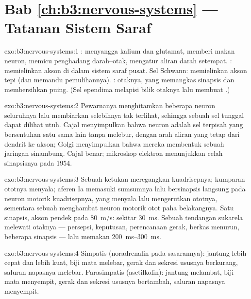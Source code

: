 \section*{Bab \ref{ch:b3:nervous-systems} --- Tatanan Sistem Saraf}

\begin{solution}{exo:b3:nervous-systems:1}
: menyangga kalium dan glutamat, memberi makan neuron, memicu
penghadang darah--otak, mengatur aliran darah setempat. :
memielinkan akson di dalam sistem saraf pusat. Sel Schwann:
memielinkan akson tepi (dan memandu pemulihannya). :
 otaknya, yang memangkas sinapsis dan membersihkan puing.
(Sel ependima melapisi bilik otaknya lalu membuat .)
\end{solution}

\begin{solution}{exo:b3:nervous-systems:2}
Pewarnanya menghitamkan beberapa neuron seluruhnya lalu membiarkan selebihnya
tak terlihat, sehingga sebuah sel tunggal dapat dilihat utuh. Cajal menyimpulkan bahwa
neuron adalah sel terpisah yang bersentuhan satu sama lain tanpa melebur, dengan
arah aliran yang tetap dari dendrit ke akson; Golgi menyimpulkan bahwa
mereka membentuk sebuah jaringan sinambung. Cajal benar; mikroskop
elektron menunjukkan celah sinapsisnya pada 1954.
\end{solution}

\begin{solution}{exo:b3:nervous-systems:3}
Sebuah ketukan meregangkan kuadrisepnya; kumparan ototnya menyala; aferen
Ia memasuki sumsumnya lalu bersinapsis langsung pada neuron motorik
kuadrisepnya, yang menyala lalu mengerutkan ototnya, sementara sebuah 
menghambat neuron motorik otot paha belakangnya. Satu sinapsis, akson pendek pada
\qty{80}{m/s}: sekitar \qty{30}{ms}. Sebuah tendangan sukarela melewati
otaknya --- persepsi, keputusan, perencanaan gerak, berkas menurun,
beberapa sinapsis --- lalu memakan \qtyrange{200}{300}{ms}.
\end{solution}

\begin{solution}{exo:b3:nervous-systems:4}
Simpatis (noradrenalin pada sasarannya): jantung lebih cepat dan lebih kuat,
biji mata melebar, gerak dan sekresi ususnya berkurang, saluran napasnya melebar.
Parasimpatis (asetilkolin): jantung melambat, biji mata menyempit, gerak
dan sekresi ususnya bertambah, saluran napasnya menyempit.
\end{solution}

